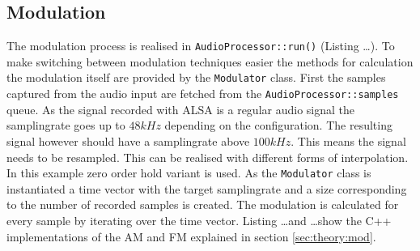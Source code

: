 \subsection{Modulation}
%
The modulation process is realised in \lstinline{AudioProcessor::run()} (Listing \dots). To make switching between modulation techniques easier the methods for calculation the modulation itself are provided by the \lstinline{Modulator} class.\p
%
First the samples captured from the audio input are fetched from the \lstinline{AudioProcessor::samples} queue. As the signal recorded with ALSA is a regular audio signal the samplingrate goes up to $48kHz$ depending on the configuration. The resulting signal however should have a samplingrate above $100kHz$. This means the signal needs to be resampled. This can be realised with different forms of interpolation. In this example zero order hold variant is used.\p
%
As the \lstinline{Modulator} class is instantiated a time vector with the target samplingrate and a size corresponding to the number of recorded samples is created. The modulation is calculated for every sample by iterating over the time vector.\p
%
Listing \dots and \dots show the C++ implementations of the AM and FM explained in section \ref{sec:theory:mod}.